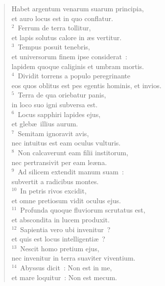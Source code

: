 \begin{flushleft}\begin{verse}\vspace{-19pt}\hspace{6pt}Habet argentum venarum suarum principia,\\\hspace{6pt} et auro locus est in quo conflatur.\\
${}^{2}$~Ferrum de terra tollitur,\\ et lapis solutus calore in \ae s vertitur.\\
${}^{3}$~Tempus posuit tenebris,\\ et universorum finem ipse considerat~:\\ lapidem quoque caliginis et umbram mortis.\\
${}^{4}$~Dividit torrens a populo peregrinante\\ eos quos oblitus est pes egentis hominis, et invios.\\
${}^{5}$~Terra de qua oriebatur panis,\\ in loco suo igni subversa est.\\
${}^{6}$~Locus sapphiri lapides ejus,\\ et gleb\ae\ illius aurum.\\
${}^{7}$~Semitam ignoravit avis,\\ nec intuitus est eam oculus vulturis.\\
${}^{8}$~Non calcaverunt eam filii institorum,\\ nec pertransivit per eam le\ae na.\\
${}^{9}$~Ad silicem extendit manum suam~:\\ subvertit a radicibus montes.\\
${}^{10}$~In petris rivos excidit,\\ et omne pretiosum vidit oculus ejus.\\
${}^{11}$~Profunda quoque fluviorum scrutatus est,\\ et abscondita in lucem produxit.\\
${}^{12}$~Sapientia vero ubi invenitur~?\\ et quis est locus intelligenti\ae~?\\
${}^{13}$~Nescit homo pretium ejus,\\ nec invenitur in terra suaviter viventium.\\
${}^{14}$~Abyssus dicit~: Non est in me,\\ et mare loquitur~: Non est mecum.\\

\end{verse}
\end{flushleft}
